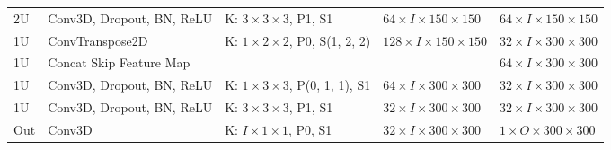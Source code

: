 \begin{sidewaystable}[htbp]
\begin{tabular}{l*{4}{l}}
      2U	& Conv3D, Dropout, BN, ReLU & K: $3 \times 3 \times 3$, P1, S1			& $64 \times I \times 150 \times 150$	& $64 \times I \times 150 \times 150$	\\
      1U	& ConvTranspose2D			& K: $1 \times 2 \times 2$, P0, S(1, 2, 2)	& $128 \times I \times 150 \times 150$	& $32 \times I \times 300 \times 300$	\\
      1U	& Concat Skip Feature Map	&											&										& $64 \times I \times 300 \times 300$	\\
      1U	& Conv3D, Dropout, BN, ReLU & K: $1 \times 3 \times 3$, P(0, 1, 1), S1	& $64 \times I \times 300 \times 300$	& $32 \times I \times 300 \times 300$	\\
      1U	& Conv3D, Dropout, BN, ReLU & K: $3 \times 3 \times 3$, P1, S1			& $32 \times I \times 300 \times 300$	& $32 \times I \times 300 \times 300$	\\
      			
      Out	& Conv3D					& K: $I \times 1 \times 1$, P0, S1			& $32 \times I \times 300 \times 300$	& $1 \times O \times 300 \times 300$	\\
      \bottomrule
   \end{tabular}
   \label{tab:architecture_fcnn_volumetric}
\end{sidewaystable}

